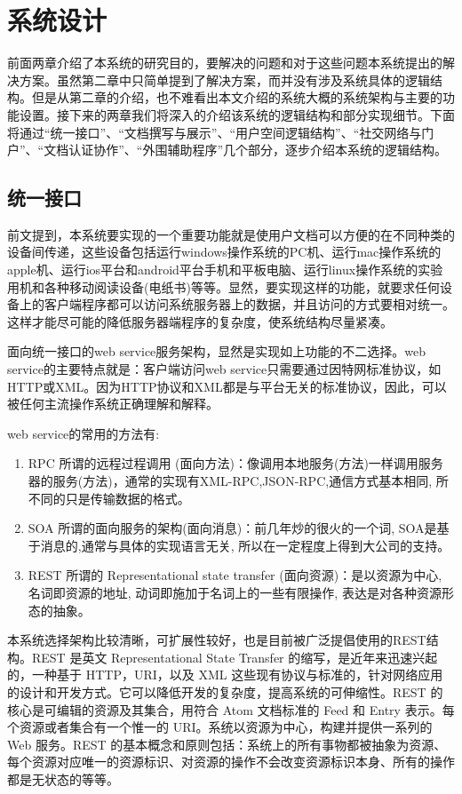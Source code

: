 
\chapter{系统设计}
\label{chap:design}

前面两章介绍了本系统的研究目的，要解决的问题和对于这些问题本系统提出的解决方案。虽然第二章中只简单提到了解决方案，而并没有涉及系统具体的逻辑结构。但是从第二章的介绍，也不难看出本文介绍的系统大概的系统架构与主要的功能设置。接下来的两章我们将深入的介绍该系统的逻辑结构和部分实现细节。下面将通过“统一接口”、“文档撰写与展示”、“用户空间逻辑结构”、“社交网络与门户”、“文档认证协作”、“外围辅助程序”几个部分，逐步介绍本系统的逻辑结构。

\section{统一接口}
\label{sec:restful}

前文提到，本系统要实现的一个重要功能就是使用户文档可以方便的在不同种类的设备间传递，这些设备包括运行windows操作系统的PC机、运行mac操作系统的apple机、运行ios平台和android平台手机和平板电脑、运行linux操作系统的实验用机和各种移动阅读设备(电纸书)等等。显然，要实现这样的功能，就要求任何设备上的客户端程序都可以访问系统服务器上的数据，并且访问的方式要相对统一。这样才能尽可能的降低服务器端程序的复杂度，使系统结构尽量紧凑。

面向统一接口的web service服务架构，显然是实现如上功能的不二选择。web service的主要特点就是：客户端访问web service只需要通过因特网标准协议，如HTTP或XML。因为HTTP协议和XML都是与平台无关的标准协议，因此，可以被任何主流操作系统正确理解和解释。

web service的常用的方法有:
\begin{enumerate}
\item RPC 所谓的远程过程调用 (面向方法)：像调用本地服务(方法)一样调用服务器的服务(方法)，通常的实现有XML-RPC,JSON-RPC,通信方式基本相同, 所不同的只是传输数据的格式。
\item SOA 所谓的面向服务的架构(面向消息)：前几年炒的很火的一个词, SOA是基于消息的,通常与具体的实现语言无关, 所以在一定程度上得到大公司的支持。
\item REST 所谓的 Representational state transfer (面向资源)：是以资源为中心, 名词即资源的地址, 动词即施加于名词上的一些有限操作, 表达是对各种资源形态的抽象。
\end{enumerate}
本系统选择架构比较清晰，可扩展性较好，也是目前被广泛提倡使用的REST结构。REST 是英文 Representational State Transfer 的缩写，是近年来迅速兴起的，一种基于 HTTP，URI，以及 XML 这些现有协议与标准的，针对网络应用的设计和开发方式。它可以降低开发的复杂度，提高系统的可伸缩性。REST 的核心是可编辑的资源及其集合，用符合 Atom 文档标准的 Feed 和 Entry 表示。每个资源或者集合有一个惟一的 URI。系统以资源为中心，构建并提供一系列的 Web 服务。REST 的基本概念和原则包括：系统上的所有事物都被抽象为资源、每个资源对应唯一的资源标识、对资源的操作不会改变资源标识本身、所有的操作都是无状态的等等。

